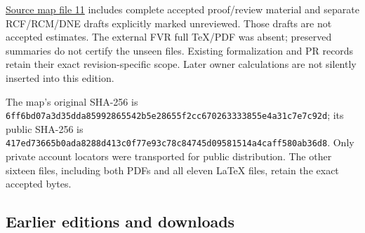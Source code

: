 \documentclass[
]{article}
\begin{document}
\href{https://github.com/KokunoYumeto/zeta-function-research-reader/blob/36b2654e1d3324c6de24e324ec34bb3a98f67103/workbenches/splitzero-tandem/continuations/20260915-operator-control-continuation/11_SOURCE_MAP.json}{Source
map file 11} includes complete accepted proof/review material and
separate RCF/RCM/DNE drafts explicitly marked unreviewed. Those drafts
are not accepted estimates. The external FVR full TeX/PDF was absent;
preserved summaries do not certify the unseen files. Existing
formalization and PR records retain their exact revision-specific scope.
Later owner calculations are not silently inserted into this edition.

The map's original SHA-256 is
\texttt{6ff6bd07a3d35dda85992865542b5e28655f2cc670263333855e4a31c7e7c92d};
its public SHA-256 is
\texttt{417ed73665b0ada8288d413c0f77e93c78c84745d09581514a4caff580ab36d8}.
Only private account locators were transported for public distribution.
The other sixteen files, including both PDFs and all eleven LaTeX files,
retain the exact accepted bytes.

\subsection{Earlier editions and
downloads}\label{earlier-editions-and-downloads-2}
\end{document}
